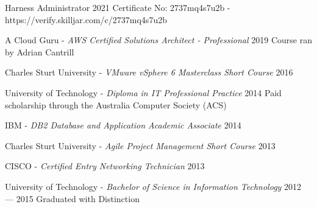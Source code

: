 
\begin{education}
  \eduitem
  {Harness Administrator} %
  {2021} %
  {Certificate No: 2737mq4s7u2b - https://verify.skilljar.com/c/2737mq4s7u2b} %

  \eduitem
  {A Cloud Guru - \emph{AWS Certified Solutions Architect - Professional}} %
  {2019} %
  {Course ran by Adrian Cantrill} %

  \eduitem
  {Charles Sturt University - \emph{VMware vSphere 6 Masterclass Short Course}} %
  {2016} %
  {} %
  
  \eduitem
  {University of Technology - \emph{Diploma in IT Professional Practice}} %
  {2014} %
  {Paid scholarship through the Australia Computer Society (ACS)} %

  \eduitem
  {IBM - \emph{DB2 Database and Application Academic Associate}} %
  {2014} %
  {} %
  
  \eduitem
  {Charles Sturt University - \emph{Agile Project Management Short Course}} %
  {2013} %
  {} %

  \eduitem
  {CISCO - \emph{Certified Entry Networking Technician}} %
  {2013} %
  {} %

  \eduitem
  {University of Technology - \emph{Bachelor of Science in Information Technology}} %
  {2012 --- 2015} %
  {Graduated with Distinction} %


\end{education}
